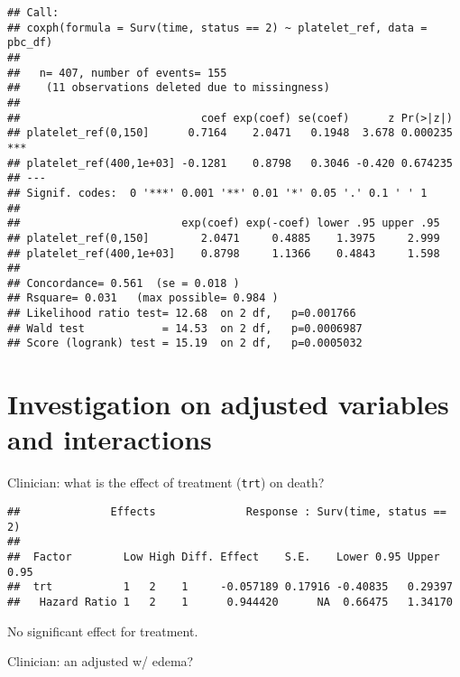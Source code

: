 \documentclass[]{book}
\newenvironment{Shaded}{\begin{snugshade}}{\end{snugshade}}
\newcommand{\KeywordTok}[1]{\textcolor[rgb]{0.13,0.29,0.53}{\textbf{{#1}}}}
\newcommand{\DataTypeTok}[1]{\textcolor[rgb]{0.13,0.29,0.53}{{#1}}}
\newcommand{\DecValTok}[1]{\textcolor[rgb]{0.00,0.00,0.81}{{#1}}}
\newcommand{\StringTok}[1]{\textcolor[rgb]{0.31,0.60,0.02}{{#1}}}
\newcommand{\NormalTok}[1]{{#1}}
\theoremstyle{definition}
\theoremstyle{definition}
\theoremstyle{definition}
\theoremstyle{remark}
\begin{document}
\begin{verbatim}
## Call:
## coxph(formula = Surv(time, status == 2) ~ platelet_ref, data = pbc_df)
## 
##   n= 407, number of events= 155 
##    (11 observations deleted due to missingness)
## 
##                            coef exp(coef) se(coef)      z Pr(>|z|)    
## platelet_ref(0,150]      0.7164    2.0471   0.1948  3.678 0.000235 ***
## platelet_ref(400,1e+03] -0.1281    0.8798   0.3046 -0.420 0.674235    
## ---
## Signif. codes:  0 '***' 0.001 '**' 0.01 '*' 0.05 '.' 0.1 ' ' 1
## 
##                         exp(coef) exp(-coef) lower .95 upper .95
## platelet_ref(0,150]        2.0471     0.4885    1.3975     2.999
## platelet_ref(400,1e+03]    0.8798     1.1366    0.4843     1.598
## 
## Concordance= 0.561  (se = 0.018 )
## Rsquare= 0.031   (max possible= 0.984 )
## Likelihood ratio test= 12.68  on 2 df,   p=0.001766
## Wald test            = 14.53  on 2 df,   p=0.0006987
## Score (logrank) test = 15.19  on 2 df,   p=0.0005032
\end{verbatim}

\section{Investigation on adjusted variables and
interactions}\label{adjusted2}

Clinician: what is the effect of treatment (\texttt{trt}) on death?

\begin{Shaded}
\end{Shaded}

\begin{verbatim}
##              Effects              Response : Surv(time, status == 2) 
## 
##  Factor        Low High Diff. Effect    S.E.    Lower 0.95 Upper 0.95
##  trt           1   2    1     -0.057189 0.17916 -0.40835   0.29397   
##   Hazard Ratio 1   2    1      0.944420      NA  0.66475   1.34170
\end{verbatim}

No significant effect for treatment.

Clinician: an adjusted w/ edema?

\begin{Shaded}
\end{Shaded}
\end{document}

